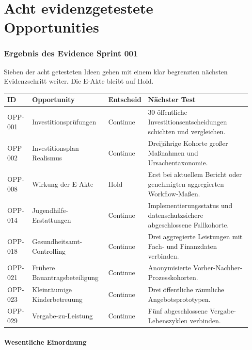 \documentclass[11pt,a4paper]{article}
\begin{document}
\part{Acht evidenzgetestete Opportunities}

\section{Ergebnis des Evidence Sprint 001}

Sieben der acht getesteten Ideen gehen mit einem klar begrenzten nächsten Evidenzschritt weiter. Die E-Akte bleibt auf Hold.

\begin{longtable}{p{1.7cm}p{4.8cm}p{2.2cm}p{6cm}}
\toprule
\textbf{ID} & \textbf{Opportunity} & \textbf{Entscheid} & \textbf{Nächster Test} \\
\midrule
OPP-001 & Investitionsprüfungen & Continue & 30 öffentliche Investitionsentscheidungen schichten und vergleichen. \\
OPP-002 & Investitionsplan-Realismus & Continue & Dreijährige Kohorte großer Maßnahmen und Ursachentaxonomie. \\
OPP-008 & Wirkung der E-Akte & Hold & Erst bei aktuellem Bericht oder genehmigten aggregierten Workflow-Maßen. \\
OPP-014 & Jugendhilfe-Erstattungen & Continue & Implementierungsstatus und datenschutzsichere abgeschlossene Fallkohorte. \\
OPP-018 & Gesundheitsamt-Controlling & Continue & Drei aggregierte Leistungen mit Fach- und Finanzdaten verbinden. \\
OPP-021 & Frühere Bauantragsbeteiligung & Continue & Anonymisierte Vorher-Nachher-Prozesskohorten. \\
OPP-023 & Kleinräumige Kinderbetreuung & Continue & Drei öffentliche räumliche Angebotsprototypen. \\
OPP-029 & Vergabe-zu-Leistung & Continue & Fünf abgeschlossene Vergabe-Lebenszyklen verbinden. \\
\bottomrule
\end{longtable}

\subsection{Wesentliche Einordnung}
\end{document}
